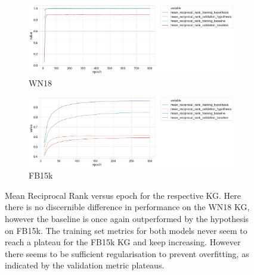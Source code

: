
\begin{figure}[H]
	\begin{subfigure}[b]{.5\linewidth}
   		\centering
    		\includegraphics[width=1.0\linewidth, height=0.6\linewidth]{WN18_mean_reciprocal_rank_Results}
		\captionsetup{justification=centering}
		\caption{WN18}
	\end{subfigure}
	\begin{subfigure}[b]{.5\linewidth}
   		\centering
		\includegraphics[width=1.0\linewidth, height=0.6\linewidth]{FB15k_mean_reciprocal_rank_Results}
		\captionsetup{justification=centering}
		\caption{FB15k}
	\end{subfigure}
	\captionsetup{justification=centering}
	\caption{Mean Reciprocal Rank versus epoch for the respective KG. Here there is no discernible difference in performance on the WN18 KG, however the baseline is once again outperformed by the hypothesis on FB15k. The training set metrics for both models never seem to reach a plateau for the FB15k KG and keep increasing. However there seems to be sufficient regularisation to prevent overfitting, as indicated by the validation metric plateaus.}
\end{figure}


